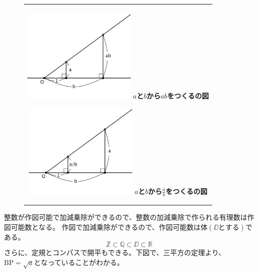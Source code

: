 \begin{figure}[H]
  \begin{center}
    \begin{tabular}{c}
        \begin{minipage}{0.5\hsize}
          \begin{center}
            \includegraphics[clip, width=5.5cm]{nakayama2/image/ab.png}
            \hspace{1.6cm} \bf $a$と$b$から$ab$をつくるの図
          \end{center}
        \end{minipage}

        \begin{minipage}{0.5\hsize}
          \begin{center}
            \includegraphics[clip, width=5.5cm]{nakayama2/image/a_b.png}
            \hspace{1.6cm} \bf $a$と$b$から$\frac{a}{b}$をつくるの図
          \end{center}
        \end{minipage}
    \end{tabular}
  \end{center}
\end{figure}\par\par\par

整数が作図可能で加減乗除ができるので、整数の加減乗除で作られる{\gt 有理数は作図可能数}となる。
作図で加減乗除ができるので、作図可能数は{\gt 体}$(\DD とする)$である。
$$\mathbb{Z} \subset \mathbb{Q} \subset \DD \subset \mathbb{R}$$
さらに、定規とコンパスで開平もできる。下図で、三平方の定理より、$\mathrm{BP} = \sqrt{a}$となっていることがわかる。

